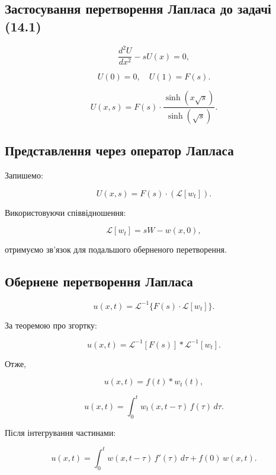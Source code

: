 \documentclass[
  ukrainian,
]{article}
\begin{document}
\subsection{Застосування перетворення Лапласа до задачі
(14.1)}\label{ux437ux430ux441ux442ux43eux441ux443ux432ux430ux43dux43dux44f-ux43fux435ux440ux435ux442ux432ux43eux440ux435ux43dux43dux44f-ux43bux430ux43fux43bux430ux441ux430-ux434ux43e-ux437ux430ux434ux430ux447ux456-14.1}

\[
\frac{d^2 U}{dx^2} - s U(x) = 0,
\]

\[
U(0) = 0, \quad U(1) = F(s).
\]

\[
U(x, s) = F(s)\cdot \frac{\sinh(x \sqrt{s})}{\sinh(\sqrt{s})}.
\]

\subsection{Представлення через оператор
Лапласа}\label{ux43fux440ux435ux434ux441ux442ux430ux432ux43bux435ux43dux43dux44f-ux447ux435ux440ux435ux437-ux43eux43fux435ux440ux430ux442ux43eux440-ux43bux430ux43fux43bux430ux441ux430}

Запишемо:

\[
U(x, s) = F(s) \cdot \left( \mathcal{L}[w_t] \right).
\]

Використовуючи співвідношення:

\[
\mathcal{L}[w_t] = s W - w(x, 0),
\]

отримуємо зв'язок для подальшого оберненого перетворення.

\subsection{Обернене перетворення
Лапласа}\label{ux43eux431ux435ux440ux43dux435ux43dux435-ux43fux435ux440ux435ux442ux432ux43eux440ux435ux43dux43dux44f-ux43bux430ux43fux43bux430ux441ux430}

\[
u(x, t) = \mathcal{L}^{-1}\{F(s)\cdot \mathcal{L}[w_t]\}.
\]

За теоремою про згортку:

\[
u(x, t) = \mathcal{L}^{-1}[F(s)] * \mathcal{L}^{-1}[w_t].
\]

Отже,

\[
u(x, t) = f(t) * w_t(t),
\]

\[
u(x, t) = \int_0^t w_t(x, t-\tau)\, f(\tau)\, d\tau.
\]

Після інтегрування частинами:

\[
u(x, t) = \int_{0}^{t} w(x, t-\tau)\, f'(\tau)\, d\tau + f(0)\, w(x, t).
\]
\end{document}
